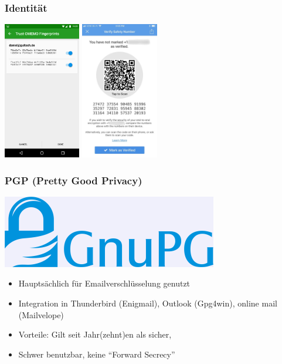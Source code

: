 \begin{frame}
  \frametitle{Identität}
    \begin{center}
      \includegraphics[height=6cm]{img/conversations-identity.jpg}
      \vspace{2cm}
      \includegraphics[height=6cm]{img/signal-identity.jpg}
    \end{center}
\end{frame}

\begin{frame}
  \frametitle{PGP (Pretty Good Privacy)}
  \begin{center}
    \includegraphics[height=0.1\textheight]{img/gpg.png}
  \end{center}
  \begin{itemize}
    \item<2->Hauptsächlich für Emailverschlüsselung genutzt
    \item<3->Integration in Thunderbird (Enigmail), Outlook (Gpg4win), online mail (Mailvelope)
    \item<4->Vorteile: Gilt seit Jahr(zehnt)en als sicher, 
    \item<5->Schwer benutzbar, keine ``Forward Secrecy''
  \end{itemize}
\end{frame}

